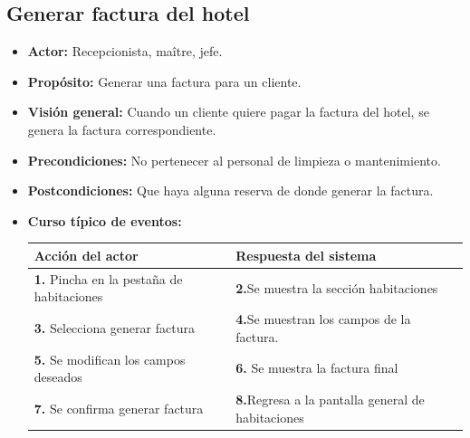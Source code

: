 \documentclass[spanish,a4paper,11pt, twoside]{report}	%
\begin{document}
	\subsection{Generar factura del hotel}
		\begin{itemize}
			\item \textbf{Actor:} Recepcionista, maître, jefe.
			\item \textbf{Propósito:} Generar una factura para un cliente.
			\item \textbf{Visión general:} Cuando un cliente quiere pagar la factura del hotel, se genera la factura correspondiente.
			\item \textbf{Precondiciones:} No pertenecer al personal de limpieza o mantenimiento.
			\item \textbf{Postcondiciones:} Que haya alguna reserva de donde generar la factura.
			\item \textbf{Curso típico de eventos:} 	\\
				\begin{tabular}{|p{6cm}||p{6cm}|}
				\hline
				\textbf{Acción del actor} & \textbf{Respuesta del sistema} \\ \hline
				\textbf{1.} Pincha en la pestaña de habitaciones & \textbf{2.}Se muestra la sección habitaciones \\ \hline 
				\textbf{3.} Selecciona generar factura & \textbf{4.}Se muestran los campos de la factura.  \\ \hline
				\textbf{5.} Se modifican los campos deseados & \textbf{6.} Se muestra la factura final \\ \hline
				\textbf{7.} Se confirma generar factura & \textbf{8.}Regresa a la pantalla general de habitaciones\\ \hline
			\end{tabular}
			\\
		\end {itemize}



	\hspace{0.6 true cm}
\end{document}
